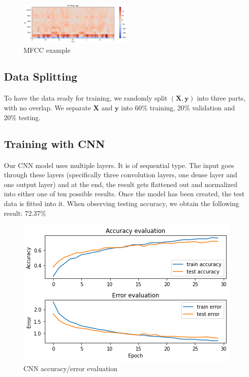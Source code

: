           \begin{figure}[H]
        \centering
        \includegraphics[width=0.5\textwidth]{images/pop_mfcc.png} 
        \caption{MFCC example}
        \end{figure}
        
    \subsection{Data Splitting}
        \paragraph{}    
        To have the data ready for training, we randomly split $(\boldsymbol{X}, \boldsymbol{y})$ into three parts, with no overlap. We separate $\boldsymbol{X}$ and $\boldsymbol{y}$ into 60\% training, 20\% validation and 20\% testing.
        
      
    \subsection{Training with CNN}
        \paragraph{}
        Our CNN model uses multiple layers. It is of sequential type. The input goes through these layers (specifically three convolution layers, one dense layer and one output layer) and at the end, the result gets flattened out and normalized into either one of ten possible results. Once the model has been created, the test data is fitted into it. When observing testing accuracy, we obtain the following result: 72.37\%
            
        \begin{figure}[H]
            \centering
            \includegraphics[width=0.45 \textwidth]{images/cnn_keras.png} 
            \caption{CNN accuracy/error evaluation}
        \end{figure}    
            
